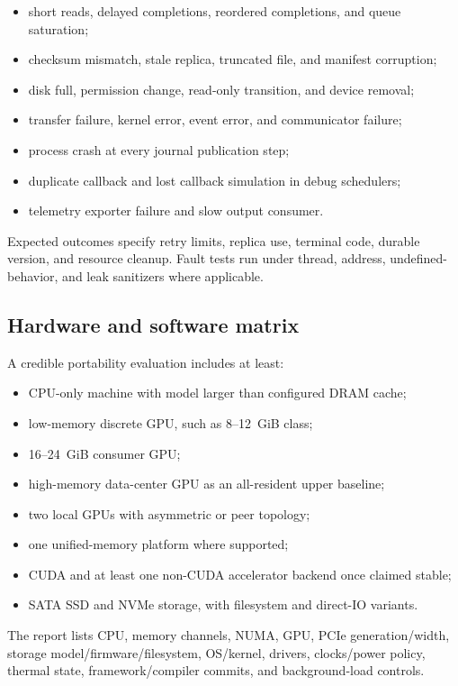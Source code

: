 \begin{itemize}
  \item short reads, delayed completions, reordered completions, and queue saturation;
  \item checksum mismatch, stale replica, truncated file, and manifest corruption;
  \item disk full, permission change, read-only transition, and device removal;
  \item transfer failure, kernel error, event error, and communicator failure;
  \item process crash at every journal publication step;
  \item duplicate callback and lost callback simulation in debug schedulers;
  \item telemetry exporter failure and slow output consumer.
\end{itemize}

Expected outcomes specify retry limits, replica use, terminal code, durable version, and resource cleanup. Fault tests run under thread, address, undefined-behavior, and leak sanitizers where applicable.

\subsection{Hardware and software matrix}

A credible portability evaluation includes at least:

\begin{itemize}
  \item CPU-only machine with model larger than configured DRAM cache;
  \item low-memory discrete GPU, such as 8--12~GiB class;
  \item 16--24~GiB consumer GPU;
  \item high-memory data-center GPU as an all-resident upper baseline;
  \item two local GPUs with asymmetric or peer topology;
  \item one unified-memory platform where supported;
  \item CUDA and at least one non-CUDA accelerator backend once claimed stable;
  \item SATA SSD and NVMe storage, with filesystem and direct-IO variants.
\end{itemize}

The report lists CPU, memory channels, NUMA, GPU, PCIe generation/width, storage model/firmware/filesystem, OS/kernel, drivers, clocks/power policy, thermal state, framework/compiler commits, and background-load controls.

